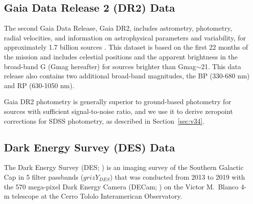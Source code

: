 \documentclass{aastex63}
\begin{document}
\subsection{Gaia Data Release 2 (DR2) Data} \label{ssec:gaia}
 
The second Gaia Data Release, Gaia DR2, includes astrometry, photometry, radial velocities, and information on astrophysical parameters and variability, for approximately 1.7 billion sources \citep{2018A&A...616A...1G}. This dataset is based on the first 22 months of the mission and includes celestial positions and the apparent brightness in the broad-band G (Gmag hereafter) for sources brighter than Gmag$\sim$21.  This data release also contains two additional broad-band magnitudes, the BP (330-680 nm) and RP (630-1050 nm).

Gaia DR2 photometry is generally superior to ground-based photometry for sources with sufficient signal-to-noise ratio, and we use 
it to derive zeropoint corrections for SDSS photometry, as described in Section~\ref{sec:v34}. 


\subsection{Dark Energy Survey (DES) Data} \label{ssec:des}


The Dark Energy Survey (DES; \citealt{2016MNRAS.460.1270D}) is an
imaging survey of the Southern Galactic Cap in 5 filter passbands
($grizY_{DES}$) that was conducted from 2013 to 2019 with the 570
mega-pixel Dark Energy Camera (DECam;
\citealt{2008arXiv0810.3600H,2015AJ....150..150F}) on the Victor
M.\ Blanco 4-m telescope at the Cerro Tololo Interamerican
Observatory.
\end{document}
